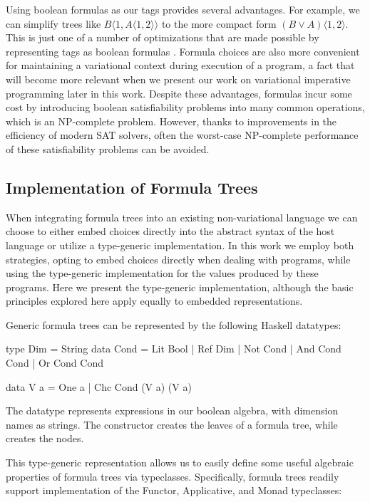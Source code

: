 \documentclass[letterpaper,10pt,onecolumn]{article}
\newcommand{\tagtree}[3]{#1 \langle #2, #3 \rangle}
\begin{document}
Using boolean formulas as our tags provides several advantages. For example, we can simplify trees like
$\tagtree{B}{1}{\tagtree{A}{1}{2}}$ to the more compact form $\tagtree{(B \vee A)}{1}{2}$. This is just
one of a number of optimizations that are made possible by representing tags as boolean formulas
\cite{walkingshaw2014projectional,hubbard2016formula}. Formula choices are also more convenient
for maintaining a variational context during execution of a program, a fact that will become
more relevant when we present our work on variational imperative programming later in
this work. Despite these advantages, formulas incur some cost by introducing boolean
satisfiability problems into many common operations, which is an NP-complete problem. However, thanks to improvements in the
efficiency of modern SAT solvers, often the worst-case NP-complete performance of these satisfiability
problems can be avoided.

\subsection{Implementation of Formula Trees}

When integrating formula trees into an existing non-variational language we can choose to
either embed choices directly into the abstract syntax of the host language or utilize a type-generic
implementation. In this work we employ both strategies, opting to embed choices directly when dealing
with programs, while using the type-generic implementation for the values produced by these programs.
Here we present the type-generic implementation, although the basic principles explored here apply
equally to embedded representations.

Generic formula trees can be represented by the following Haskell datatypes:

\begin{program}
type Dim = String
data Cond =
    Lit Bool
  | Ref Dim
  | Not Cond
  | And Cond Cond
  | Or Cond Cond

data V a = One a | Chc Cond (V a) (V a) 
\end{program}

The datatype  represents expressions in our boolean algebra, with dimension names as strings.
The constructor  creates the leaves of a formula tree, while  creates the nodes.

This type-generic representation allows us to easily define some useful algebraic properties of
formula trees via typeclasses. Specifically, formula trees readily support implementation of the
Functor, Applicative, and Monad typeclasses:
\end{document}
